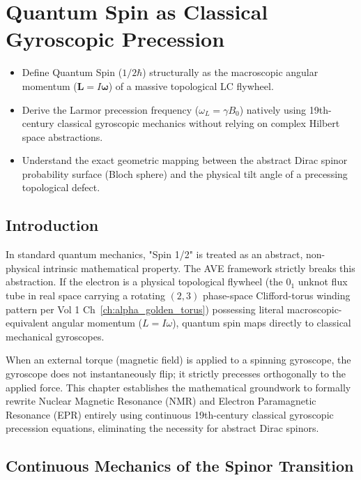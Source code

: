 \chapter{Quantum Spin as Classical Gyroscopic Precession}
\label{ch:quantum_spin}

\begin{objectivebox}
\begin{itemize}
    \item Define Quantum Spin ($1/2\hbar$) structurally as the macroscopic angular momentum ($\mathbf{L} = I\boldsymbol{\omega}$) of a massive topological LC flywheel.
    \item Derive the Larmor precession frequency ($\omega_L = \gamma B_0$) natively using 19th-century classical gyroscopic mechanics without relying on complex Hilbert space abstractions.
    \item Understand the exact geometric mapping between the abstract Dirac spinor probability surface (Bloch sphere) and the physical tilt angle of a precessing topological defect.
\end{itemize}
\end{objectivebox}

\section{Introduction}
In standard quantum mechanics, "Spin 1/2" is treated as an abstract, non-physical intrinsic mathematical property. The AVE framework strictly breaks this abstraction. If the electron is a physical topological flywheel (the $0_1$ unknot flux tube in real space carrying a rotating $(2,3)$ phase-space Clifford-torus winding pattern per Vol 1 Ch~\ref{ch:alpha_golden_torus}) possessing literal macroscopic-equivalent angular momentum ($L = I\omega$), quantum spin maps directly to classical mechanical gyroscopes.

When an external torque (magnetic field) is applied to a spinning gyroscope, the gyroscope does not instantaneously flip; it strictly precesses orthogonally to the applied force. This chapter establishes the mathematical groundwork to formally rewrite Nuclear Magnetic Resonance (NMR) and Electron Paramagnetic Resonance (EPR) entirely using continuous 19th-century classical gyroscopic precession equations, eliminating the necessity for abstract Dirac spinors.

\section{Continuous Mechanics of the Spinor Transition}

